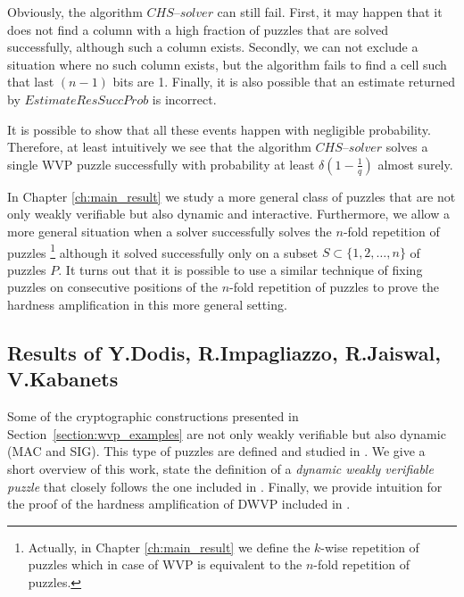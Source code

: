 Obviously, the algorithm $\mathit{CHS\text{--}solver}$ can still fail. First, it may happen that it does not find a column
with a high fraction of puzzles that are solved successfully, although such a column exists.
Secondly, we can not exclude a situation where no such column exists, but the algorithm fails to find a cell such that last $(n-1)$ bits are 1.
Finally, it is also possible that an estimate returned by $\mathit{EstimateResSuccProb}$ is incorrect.

It is possible to show that all these events happen with negligible probability.
Therefore, at least intuitively we see that the algorithm $\mathit{CHS\text{--}solver}$
solves a single WVP puzzle successfully with probability at least $\delta(1-\frac{1}{q})$ almost surely.

In Chapter \ref{ch:main_result} we study a more general class of puzzles that are not only weakly verifiable but also dynamic and interactive.
Furthermore, we allow a more general situation when a solver successfully solves the $n$-fold repetition of puzzles
\footnote{Actually, in Chapter \ref{ch:main_result} we define the $k$-wise repetition of puzzles
which in case of WVP is equivalent to the $n$-fold repetition of puzzles.}
although it solved successfully only on a subset $S \subset \{1,2,\dotsc, n\}$ of puzzles $P$.
It turns out that it is possible to use a similar technique of fixing puzzles on consecutive positions of the $n$-fold repetition of
puzzles to prove the hardness amplification in this more general setting.
%
\subsection{Results of Y.Dodis, R.Impagliazzo, R.Jaiswal, V.Kabanets}
\label{subsec:dijk}
Some of the cryptographic constructions presented in Section~\ref{section:wvp_examples}
are not only weakly verifiable but also dynamic (MAC and SIG). This type of puzzles are defined and studied in \cite{Dodis:2009:SAI:1530441.1530450}.
We give a short overview of this work, state the definition of a \textit{dynamic weakly verifiable puzzle} that closely follows
the one included in \cite{Dodis:2009:SAI:1530441.1530450}. Finally, we provide intuition for the proof of the hardness amplification of DWVP
included in \cite{Dodis:2009:SAI:1530441.1530450}.

